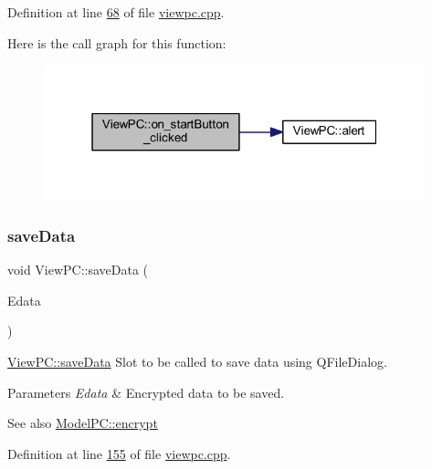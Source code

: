 Definition at line \mbox{\hyperlink{viewpc_8cpp_source_l00068}{68}} of file \mbox{\hyperlink{viewpc_8cpp_source}{viewpc.\+cpp}}.

Here is the call graph for this function\+:
\nopagebreak
\begin{figure}[H]
\begin{center}
\leavevmode
\includegraphics[width=313pt]{class_view_p_c_a456d75b7c5d3a089302a576e7359f1f4_cgraph}
\end{center}
\end{figure}
\mbox{\label{class_view_p_c_aaff156103970be7c777beedaf0020604}} 
\subsubsection{\texorpdfstring{save\+Data}{saveData}}
{\footnotesize\ttfamily void View\+P\+C\+::save\+Data (\begin{DoxyParamCaption}\item[{Q\+Byte\+Array}]{Edata }\end{DoxyParamCaption})\hspace{0.3cm}{\ttfamily [slot]}}



\mbox{\hyperlink{class_view_p_c_aaff156103970be7c777beedaf0020604}{View\+P\+C\+::save\+Data}} Slot to be called to save data using Q\+File\+Dialog. 


\begin{DoxyParams}{Parameters}
{\em Edata} & Encrypted data to be saved. \\
\hline
\end{DoxyParams}
\begin{DoxySeeAlso}{See also}
\mbox{\hyperlink{class_model_p_c_a8ef76567bc0c0307b4e2547c46536e51}{Model\+P\+C\+::encrypt}} 
\end{DoxySeeAlso}


Definition at line \mbox{\hyperlink{viewpc_8cpp_source_l00155}{155}} of file \mbox{\hyperlink{viewpc_8cpp_source}{viewpc.\+cpp}}.

